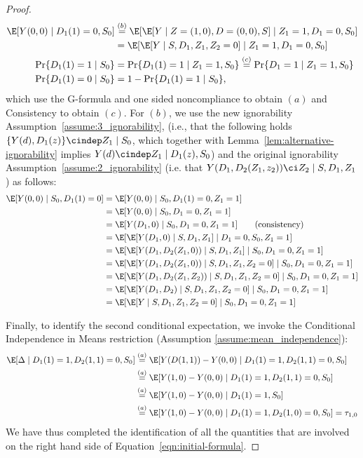 \begin{proof}
\begin{align*}
\E[ Y(0,0) \mid D_1(1)=0, S_0 ]
&\stackrel{(b)}{=}\E[ \E[ Y \mid Z=(1,0), D=(0,0), S ] \mid Z_1=1, D_1=0, S_0 ]          \\
&=\E[ \E[ Y \mid S, D_1, Z_1, Z_2=0] \mid Z_1=1, D_1=0, S_0 ]          \\
\Pr\{ D_1(1)=1 \mid S_0 \}
&=\Pr\{ D_1(1)=1 \mid Z_1=1, S_0 \}  
\stackrel{(c)}{=}\Pr\{ D_1=1 \mid Z_1=1, S_0 \}     \\
\Pr\{ D_1(1)=0 \mid S_0 \}
&=1 - \Pr\{ D_1(1)=1 \mid S_0 \}, 
\end{align*}
which 
 use the G-formula and one sided noncompliance to obtain $(a)$ and
 Consistency to obtain $(c)$.
For $(b)$, we use the new ignorability Assumption~\ref{assume:3_ignorability}, (i.e., that the following holds $\{Y(d), D_1(z)\} \cindep Z_1 \mid S_0$, which together with Lemma~\ref{lem:alternative-ignorability} implies $Y(d) \cindep Z_1 \mid D_1(z), S_0$) and the original ignorability Assumption~\ref{assume:2_ignorability} (i.e. that $Y(D_1, D_2(Z_1, z_2)) \ci Z_2 \mid S, D_1, Z_1$) as follows:
\begin{align*}
\E[ Y(0,0) \mid S_0, D_1(1)=0 ]
&=
  \E[ Y(0,0) \mid S_0, D_1(1)=0, Z_1=1 ]  \\
&=
  \E[ Y(0,0) \mid S_0, D_1=0, Z_1=1 ]     \\
&=
  \E[ Y(D_1,0) \mid S_0, D_1=0, Z_1=1 ]  \tag{consistency}   \\
&=
  \E[ \E[ Y(D_1,0) \mid S, D_1, Z_1] \mid D_1=0, S_0, Z_1=1 ]         \\
&=
  \E[ \E[ Y(D_1, D_2(Z_1, 0)) \mid S, D_1, Z_1 ] \mid S_0, D_1=0, Z_1=1 ]         \\
&=
  \E[ \E[ Y(D_1, D_2(Z_1, 0)) \mid S, D_1, Z_1, Z_2=0] \mid S_0, D_1=0, Z_1=1 ]       \\
&=
  \E[ \E[ Y(D_1, D_2(Z_1, Z_2)) \mid S, D_1, Z_1, Z_2=0] \mid S_0, D_1=0, Z_1=1 ]       \\
&=
  \E[ \E[ Y(D_1, D_2) \mid S, D_1, Z_1, Z_2=0] \mid S_0, D_1=0, Z_1=1 ]       \\
&=
  \E[ \E[ Y \mid S, D_1, Z_1, Z_2=0] \mid S_0, D_1=0, Z_1=1 ]
\end{align*}


\noindent
  Finally, to identify the second conditional expectation, we invoke the Conditional Independence in Means restriction (Assumption \ref{assume:mean_independence}): 
\begin{align*}
\E[ \Delta \mid D_1(1)=1, D_2(1,1)=0, S_0 ]           
&\stackrel{(a)}{=}\E[ Y(D(1,1)) - Y(0,0) \mid D_1(1)=1, D_2(1,1)=0, S_0 ]  \\
&\stackrel{(a)}{=}\E[ Y(1,0) - Y(0,0) \mid D_1(1)=1, D_2(1,1)=0, S_0 ]  \\
&\stackrel{(a)}{=}\E[ Y(1,0) - Y(0,0) \mid D_1(1)=1, S_0 ]\\
&\stackrel{(a)}{=}\E[ Y(1,0) - Y(0,0) \mid D_1(1)=1, D_2(1,0)=0, S_0 ] = \tau_{1,0}
\end{align*}
We have thus completed the identification of all the quantities that are involved on the right hand side of Equation~\eqref{eqn:initial-formula}.




\end{proof}


